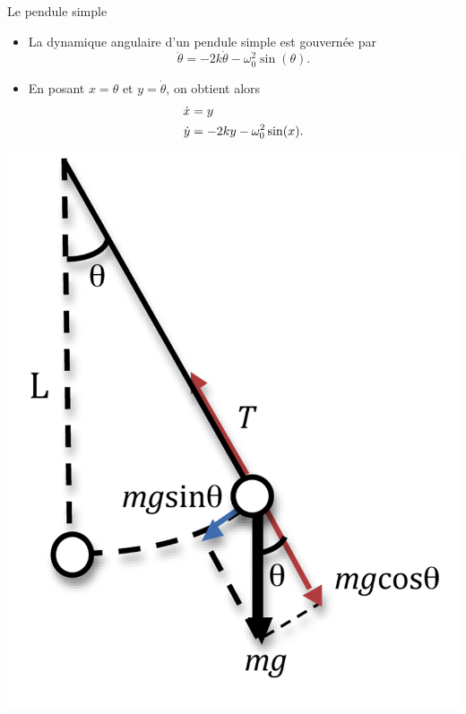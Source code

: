 \documentclass[usenames,dvipsnames,svgnames,10pt,aspectratio=169]{beamer}
\begin{document}
\begin{frame}[t, c]{Le pendule simple}{}
	\begin{minipage}{.48\textwidth}
		\begin{itemize}
			\item La dynamique angulaire d'un pendule simple est gouvernée par
			$$\ddot{\theta} = -2k \dot{\theta} -\omega_0^2 \sin(\theta).$$

			\bigskip

			\item En posant $x = \theta$ et $y = \dot{\theta}$, on obtient alors
			\begin{equation}
				\begin{aligned}
					\dot{x} & = y \\
					\dot{y} & = -2k y -\omega_0^2 \sin(x).
				\end{aligned}
				\notag
			\end{equation}
		\end{itemize}
	\end{minipage}%
	\hfill
	\begin{minipage}{.48\textwidth}
		\centering
		\includegraphics[width=.75\textwidth]{pendulum_sketch}
	\end{minipage}

	\vspace{0.5cm}
\end{frame}
\end{document}
